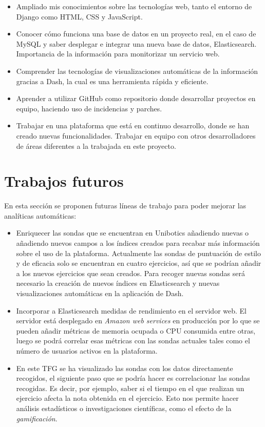 		\begin{itemize}
			\item Ampliado mis conocimientos sobre las tecnologías web, tanto el entorno de Django como HTML, CSS y JavaScript.
			
			\item Conocer cómo funciona una base de datos en un proyecto real, en el caso de MySQL y saber desplegar e integrar una nueva base de datos, Elasticsearch. Importancia de la información para monitorizar un servicio web. 
			
			\item Comprender las tecnologías de visualizaciones automáticas de la información gracias a Dash, la cual es una herramienta rápida y eficiente.
			
			\item Aprender a utilizar GitHub como repositorio donde desarrollar proyectos en equipo, haciendo uso de incidencias y parches. 
			
			\item Trabajar en una plataforma que está en continuo desarrollo, donde se han creado nuevas funcionalidades. Trabajar en equipo con otros desarrolladores de áreas diferentes a la trabajada en este proyecto.			
		\end{itemize}
	\section{Trabajos futuros} 
	\label{sec:trabajos_futuros} 

		En esta sección se proponen futuras líneas de trabajo para poder mejorar las analíticas automáticas:

		\begin{itemize}
			\item Enriquecer las sondas que se encuentran en Unibotics añadiendo nuevas o añadiendo nuevos campos a los índices creados para recabar más información sobre el uso de la plataforma. Actualmente las sondas de puntuación de estilo y de eficacia solo se encuentran en cuatro ejercicios, así que se podrían añadir a los nuevos ejercicios que sean creados. Para recoger nuevas sondas será necesario la creación de nuevos índices en Elasticsearch y nuevas visualizaciones automáticas en la aplicación de Dash.\\
\item Incorporar a Elasticsearch medidas de rendimiento en el servidor web. El servidor está desplegado en \textit{Amazon web services} en producción por lo que se pueden añadir métricas de memoria ocupada o CPU consumida entre otras, luego se podrá correlar esas métricas con las sondas actuales tales como el número de usuarios activos en la plataforma.

\item En este TFG se ha visualizado las sondas con los datos directamente recogidos, el siguiente paso que se podría hacer es correlacionar las sondas recogidas. Es decir, por ejemplo, saber si el tiempo en el que realizan un ejercicio afecta la nota obtenida en el ejercicio. Esto nos permite hacer análisis estadísticos o investigaciones científicas, como el efecto de la \textit{gamificación}.\\
		\end{itemize}
